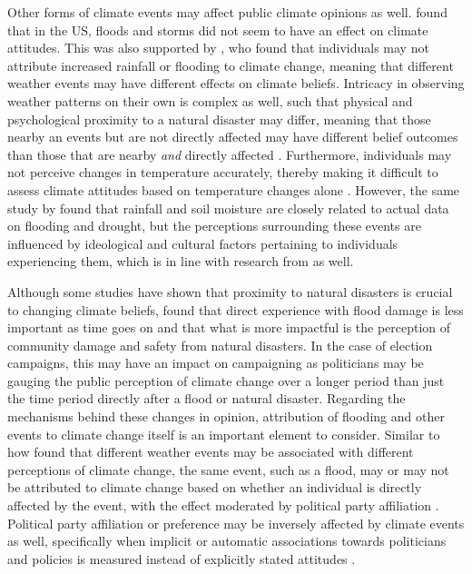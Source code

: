\documentclass[12pt,letterpaper]{article}
\begin{document}
Other forms of climate events may affect public climate opinions as well. \textcite{viscontiEffectDifferentExtreme2024} found that in the US, floods and storms did not seem to have an effect on climate attitudes. This was also supported by \textcite{loComeRainShine2015}, who found that individuals may not attribute increased rainfall or flooding to climate change, meaning that different weather events may have different effects on climate beliefs. Intricacy in observing weather patterns on their own is complex as well, such that physical and psychological proximity to a natural disaster may differ, meaning that those nearby an events but are not directly affected may have different belief outcomes than those that are nearby \textit{and} directly affected \autocite{siscoEffectsWeatherExperiences2021}. Furthermore, individuals may not perceive changes in temperature accurately, thereby making it difficult to assess climate attitudes based on temperature changes alone \autocite{goebbertWeatherClimateWorldviews2012}. However, the same study by \textcite{goebbertWeatherClimateWorldviews2012} found that rainfall and soil moisture are closely related to actual data on flooding and drought, but the perceptions surrounding these events are influenced by ideological and cultural factors pertaining to individuals experiencing them, which is in line with research from \textcite{osberghausNaturalDisastersClimate2022} as well.

Although some studies have shown that proximity to natural disasters is crucial to changing climate beliefs, \textcite{albrightBeliefsClimateChange2019} found that direct experience with flood damage is less important as time goes on and that what is more impactful is the perception of community damage and safety from natural disasters. In the case of election campaigns, this may have an impact on campaigning as politicians may be gauging the public perception of climate change over a longer period than just the time period directly after a flood or natural disaster. Regarding the mechanisms behind these changes in opinion, attribution of flooding and other events to climate change itself is an important element to consider. Similar to how \textcite{loComeRainShine2015} found that different weather events may be associated with different perceptions of climate change, the same event, such as a flood, may or may not be attributed to climate change based on whether an individual is directly affected by the event, with the effect moderated by political party affiliation \autocite{ogunbodeIndividualLocalFlooding2020}. Political party affiliation or preference may be inversely affected by climate events as well, specifically when implicit or automatic associations towards politicians and policies is measured instead of explicitly stated attitudes \autocite{rudmanWhenTruthPersonally2013a}. 
\end{document}
